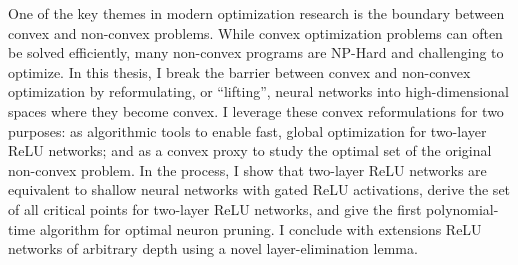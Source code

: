 

One of the key themes in modern optimization research is the boundary between
convex and non-convex problems.
While convex optimization problems can often be solved efficiently, many
non-convex programs are NP-Hard and challenging to optimize.
In this thesis, I break the barrier between convex and non-convex optimization
by reformulating, or ``lifting'', neural networks into high-dimensional spaces
where they become convex.
I leverage these convex reformulations for two purposes: as algorithmic tools
to enable fast, global optimization for two-layer ReLU networks; and as a
convex proxy to study the optimal set of the original non-convex problem.
In the process, I show that two-layer ReLU networks are equivalent to shallow
neural networks with gated ReLU activations, derive the set of all critical
points for two-layer ReLU networks, and give the first polynomial-time
algorithm for optimal neuron pruning.
I conclude with extensions ReLU networks of arbitrary depth using a novel
layer-elimination lemma.
